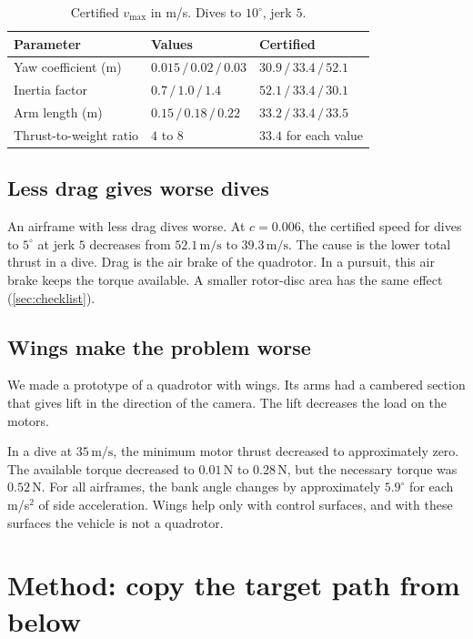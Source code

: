\documentclass[11pt]{article}
\newcommand{\ms}{\,\mathrm{m/s}}
\begin{document}
\begin{table}[h]
\centering
\caption{Certified $v_{\max}$ in m/s. Dives to $10^\circ$, jerk $5$.}
\label{tab:agility}
\begin{tabular}{@{}lll@{}}
\toprule
Parameter & Values & Certified \\
\midrule
Yaw coefficient (m) & $0.015 \,/\, 0.02 \,/\, 0.03$ & $30.9 \,/\, 33.4 \,/\, \mathbf{52.1}$ \\
Inertia factor & $0.7 \,/\, 1.0 \,/\, 1.4$ & $\mathbf{52.1} \,/\, 33.4 \,/\, 30.1$ \\
Arm length (m) & $0.15 \,/\, 0.18 \,/\, 0.22$ & $33.2 \,/\, 33.4 \,/\, 33.5$ \\
Thrust-to-weight ratio & $4$ to $8$ & $33.4$ for each value \\
\bottomrule
\end{tabular}
\end{table}

\subsection{Less drag gives worse dives}
\label{sec:paradox}

An airframe with less drag dives worse.
At $c = 0.006$, the certified speed for dives to $5^\circ$ at jerk $5$ decreases from $52.1\ms$ to
$39.3\ms$.
The cause is the lower total thrust in a dive.
Drag is the air brake of the quadrotor.
In a pursuit, this air brake keeps the torque available.
A smaller rotor-disc area has the same effect (\cref{sec:checklist}).

\subsection{Wings make the problem worse}

We made a prototype of a quadrotor with wings.
Its arms had a cambered section that gives lift in the direction of the camera.
The lift decreases the load on the motors.

In a dive at $35\ms$, the minimum motor thrust decreased to approximately zero.
The available torque decreased to $0.01$\,N to $0.28$\,N, but the necessary torque was $0.52$\,N.
For all airframes, the bank angle changes by approximately $5.9^\circ$ for each m/s$^2$ of side
acceleration.
Wings help only with control surfaces, and with these surfaces the vehicle is not a quadrotor.

\section{Method: copy the target path from below}
\label{sec:strategy}
\end{document}

